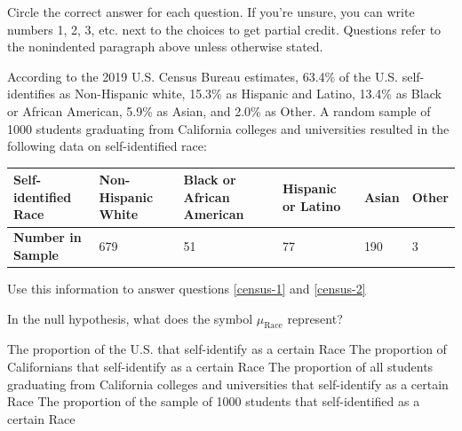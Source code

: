 \documentclass{article}
\begin{document}
	Circle the correct answer for each question.  If you're unsure, you can write numbers 1, 2, 3, etc. next to the choices to get partial credit.  Questions refer to the nonindented paragraph above unless otherwise stated.\\[.5cm]
	
	\begin{mcquestions}
		
		\begin{mcquestioninstruction}
			According to the 2019 U.S. Census Bureau estimates, 63.4\% of the U.S. self-identifies as Non-Hispanic white, 15.3\% as Hispanic and Latino, 13.4\% as Black or African American, 5.9\% as Asian, and 2.0\% as Other. A random sample of 1000 students graduating from California colleges and universities resulted in the following data on self-identified race:
			\begin{center}
				\begin{tabular}{| p{1in} | p{1in} | p{1in} | p{1in} | p{1in} | p{1in} |}
					\hline
					\textbf{Self-identified Race} & Non-Hispanic White & Black or African American & Hispanic or Latino & Asian & Other \\
					\hline
					\textbf{Number in Sample} & 679 & 51 & 77 & 190 & 3 \\
					\hline
				\end{tabular}
			\end{center}
			Use this information to answer questions \ref{census-1} and \ref{census-2}
		\end{mcquestioninstruction}
		
		\question In the null hypothesis, what does the symbol \(\mu_{\text{Race}}\) represent? \label{census-1}
		\begin{mcanswerslist}
			\answer  The proportion of the U.S. that self-identify as a certain Race
			\answer  The proportion of Californians that self-identify as a certain Race
			\answer[correct]  The proportion of all students graduating from California colleges and universities that self-identify as a certain Race
			\answer  The proportion of the sample of 1000 students that self-identified as a certain Race
		\end{mcanswerslist}
		

\end{mcquestions}
\end{document}
